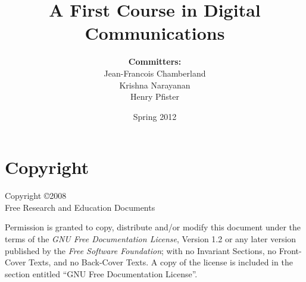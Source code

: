 \documentclass[12pt,openright]{book}
\newif\ifjfc
\newif\ifhdp
\begin{document}
\frontmatter

\author{
\textbf{Committers:} \\
Jean-Francois Chamberland \\
Krishna Narayanan \\
Henry Pfister}

\title{A First Course in Digital Communications}

\date{Spring 2012}

\maketitle

\chapter*{Copyright}
Copyright \copyright 2008 \\
Free Research and Education Documents

Permission is granted to copy, distribute and/or modify this document under the terms of the \emph{GNU Free Documentation License}, Version 1.2 or any later version published by the \emph{Free Software Foundation}; with no Invariant Sections, no Front-Cover Texts, and no Back-Cover Texts.
A copy of the license is included in the section entitled ``GNU Free Documentation License''.

\tableofcontents



\mainmatter

\ifjfc







\fi

\ifhdp







\fi
\appendix

%

\backmatter

\cleardoublepage  
{}  
{}  
\printindex
\end{document}
